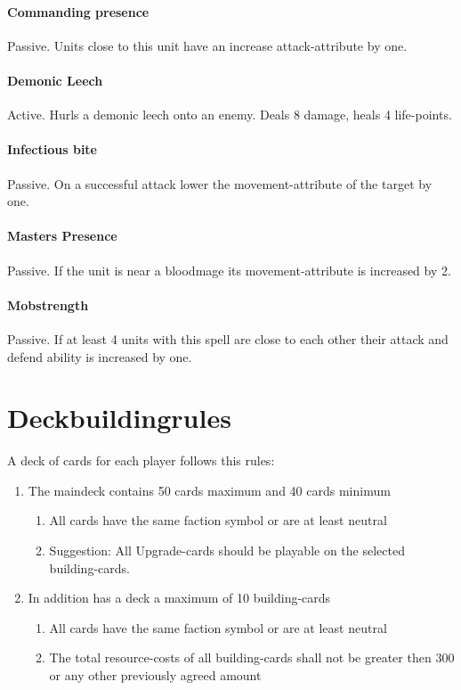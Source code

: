 \documentclass[a5paper,pagesize,10pt,bibtotoc,pointlessnumbers,
normalheadings,DIV=9,twoside=false]{scrbook}
\begin{document}
\subsubsection{Commanding presence}
Passive. Units close to this unit have an increase attack-attribute by one.

\subsubsection{Demonic Leech}
Active. Hurls a demonic leech onto an enemy. Deals 8 damage, heals 4 life-points.

\subsubsection{Infectious bite}
Passive. On a successful attack lower the movement-attribute of the target by one.

\subsubsection{Masters Presence}
Passive. If the unit is near a bloodmage its movement-attribute is increased by 2.

\subsubsection{Mobstrength}
Passive. If at least 4 units with this spell are close to each other their attack and defend ability is increased by one.



\chapter{Deckbuildingrules}

A deck of cards for each player follows this rules:

\begin{enumerate}
\item The maindeck contains 50 cards maximum and 40 cards minimum
\begin{enumerate}
\item All cards have the same faction symbol or are at least neutral
\item Suggestion: All Upgrade-cards should be playable on the selected building-cards.
\end{enumerate}
\item In addition has a deck a maximum of 10 building-cards
\begin{enumerate}
\item All cards have the same faction symbol or are at least neutral
\item The total resource-costs of all building-cards shall not be greater then 300 or any other previously agreed amount
\end{enumerate}
\end{enumerate}
\end{document}
